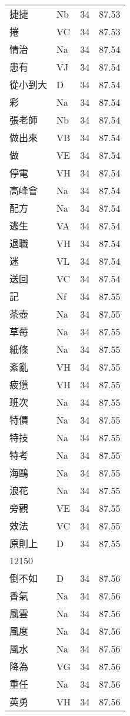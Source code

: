 \documentclass[twocolumn]{book}
\begin{document}
\begin{supertabular}{llrr}
捷捷 & Nb & 34 &  87.53\\
捲 & VC & 34 &  87.53\\
情治 & Na & 34 &  87.54\\
患有 & VJ & 34 &  87.54\\
從小到大 & D & 34 &  87.54\\
彩 & Na & 34 &  87.54\\
張老師 & Nb & 34 &  87.54\\
做出來 & VB & 34 &  87.54\\
做 & VE & 34 &  87.54\\
停電 & VH & 34 &  87.54\\
高峰會 & Na & 34 &  87.54\\
配方 & Na & 34 &  87.54\\
逃生 & VA & 34 &  87.54\\
退職 & VH & 34 &  87.54\\
迷 & VL & 34 &  87.54\\
送回 & VC & 34 &  87.54\\
記 & Nf & 34 &  87.55\\
茶壺 & Na & 34 &  87.55\\
草莓 & Na & 34 &  87.55\\
紙條 & Na & 34 &  87.55\\
紊亂 & VH & 34 &  87.55\\
疲憊 & VH & 34 &  87.55\\
班次 & Na & 34 &  87.55\\
特價 & Na & 34 &  87.55\\
特技 & Na & 34 &  87.55\\
特考 & Na & 34 &  87.55\\
海鷗 & Na & 34 &  87.55\\
浪花 & Na & 34 &  87.55\\
旁觀 & VE & 34 &  87.55\\
效法 & VC & 34 &  87.55\\
原則上 & D & 34 &  87.55\\
12150\\
倒不如 & D & 34 &  87.56\\
香氣 & Na & 34 &  87.56\\
風雲 & Na & 34 &  87.56\\
風度 & Na & 34 &  87.56\\
風水 & Na & 34 &  87.56\\
降為 & VG & 34 &  87.56\\
重任 & Na & 34 &  87.56\\
英勇 & VH & 34 &  87.56\\

\end{supertabular}
\end{document}
